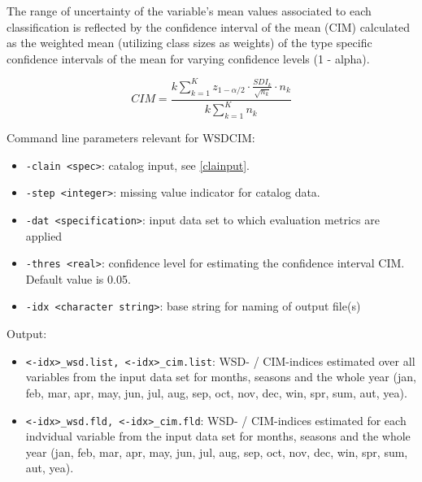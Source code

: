 \documentclass[12pt, oneside, a4paper, headsepline, plainheadsepline]{scrbook}
\begin{document}
The range of uncertainty of the variable's mean values associated to each classification is reflected by the confidence interval of the mean (CIM) calculated as the weighted mean (utilizing class sizes as weights) of the type specific confidence intervals of the mean for varying confidence levels (1 - alpha).

\begin{equation}
CIM=\frac{k\sum_{k=1}^{K}z_{1-\alpha/2}\cdot\frac{SDI_k}{\sqrt{n_k}}\cdot n_k}{k\sum_{k=1}^{K}n_k}
\end{equation}

Command line parameters relevant for WSDCIM:

\begin{itemize}
\item \verb+-clain <spec>+:  catalog input, see \ref{clainput}.
\item \verb+-step <integer>+: missing value indicator for catalog data.
\item\verb+-dat <specification>+: input data set to which evaluation metrics are applied

\item \verb+-thres <real>+: confidence level for estimating the confidence interval CIM. Default value is 0.05.
\item \verb+-idx <character string>+: base string for naming of output file(s)
\end{itemize}

Output:
\begin{itemize}
\item  \verb+<-idx>_wsd.list, <-idx>_cim.list+: WSD- / CIM-indices estimated over all variables from the input data set for months, seasons and the whole year (jan, feb, mar, apr, may, jun, jul, aug, sep, oct, nov, dec, win, spr, sum, aut, yea).
\item  \verb+<-idx>_wsd.fld, <-idx>_cim.fld+: WSD- / CIM-indices estimated for each indvidual variable from the input data set for months, seasons and the whole year (jan, feb, mar, apr, may, jun, jul, aug, sep, oct, nov, dec, win, spr, sum, aut, yea).
\end{itemize}
 
\end{document}
